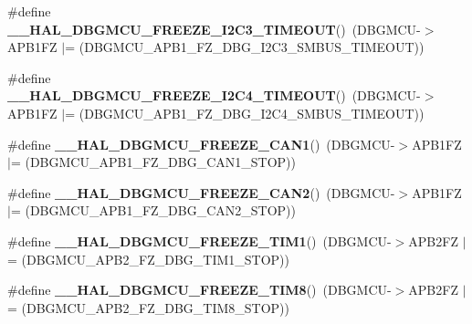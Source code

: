 \begin{DoxyCompactItemize}
\#define {\bfseries \+\_\+\+\_\+\+H\+A\+L\+\_\+\+D\+B\+G\+M\+C\+U\+\_\+\+F\+R\+E\+E\+Z\+E\+\_\+\+I2\+C3\+\_\+\+T\+I\+M\+E\+O\+UT}()~(D\+B\+G\+M\+CU-\/$>$A\+P\+B1\+FZ $\vert$= (D\+B\+G\+M\+C\+U\+\_\+\+A\+P\+B1\+\_\+\+F\+Z\+\_\+\+D\+B\+G\+\_\+\+I2\+C3\+\_\+\+S\+M\+B\+U\+S\+\_\+\+T\+I\+M\+E\+O\+UT))
\item 
\mbox{\label{group___h_a_l___exported___macros_ga94dfdca0c7c69da6f2cf1c516bc1b02c}} 
\#define {\bfseries \+\_\+\+\_\+\+H\+A\+L\+\_\+\+D\+B\+G\+M\+C\+U\+\_\+\+F\+R\+E\+E\+Z\+E\+\_\+\+I2\+C4\+\_\+\+T\+I\+M\+E\+O\+UT}()~(D\+B\+G\+M\+CU-\/$>$A\+P\+B1\+FZ $\vert$= (D\+B\+G\+M\+C\+U\+\_\+\+A\+P\+B1\+\_\+\+F\+Z\+\_\+\+D\+B\+G\+\_\+\+I2\+C4\+\_\+\+S\+M\+B\+U\+S\+\_\+\+T\+I\+M\+E\+O\+UT))
\item 
\mbox{\label{group___h_a_l___exported___macros_ga1d225003f36f6a22ffea1a41a4a78cec}} 
\#define {\bfseries \+\_\+\+\_\+\+H\+A\+L\+\_\+\+D\+B\+G\+M\+C\+U\+\_\+\+F\+R\+E\+E\+Z\+E\+\_\+\+C\+A\+N1}()~(D\+B\+G\+M\+CU-\/$>$A\+P\+B1\+FZ $\vert$= (D\+B\+G\+M\+C\+U\+\_\+\+A\+P\+B1\+\_\+\+F\+Z\+\_\+\+D\+B\+G\+\_\+\+C\+A\+N1\+\_\+\+S\+T\+OP))
\item 
\mbox{\label{group___h_a_l___exported___macros_gadb4f2b03a03936de95c1a9f939d452c0}} 
\#define {\bfseries \+\_\+\+\_\+\+H\+A\+L\+\_\+\+D\+B\+G\+M\+C\+U\+\_\+\+F\+R\+E\+E\+Z\+E\+\_\+\+C\+A\+N2}()~(D\+B\+G\+M\+CU-\/$>$A\+P\+B1\+FZ $\vert$= (D\+B\+G\+M\+C\+U\+\_\+\+A\+P\+B1\+\_\+\+F\+Z\+\_\+\+D\+B\+G\+\_\+\+C\+A\+N2\+\_\+\+S\+T\+OP))
\item 
\mbox{\label{group___h_a_l___exported___macros_ga93d7e54d78e5dea068f5f6a94d5f94c7}} 
\#define {\bfseries \+\_\+\+\_\+\+H\+A\+L\+\_\+\+D\+B\+G\+M\+C\+U\+\_\+\+F\+R\+E\+E\+Z\+E\+\_\+\+T\+I\+M1}()~(D\+B\+G\+M\+CU-\/$>$A\+P\+B2\+FZ $\vert$= (D\+B\+G\+M\+C\+U\+\_\+\+A\+P\+B2\+\_\+\+F\+Z\+\_\+\+D\+B\+G\+\_\+\+T\+I\+M1\+\_\+\+S\+T\+OP))
\item 
\mbox{\label{group___h_a_l___exported___macros_gaeee90b698bfc2421155265b4c5b43f09}} 
\#define {\bfseries \+\_\+\+\_\+\+H\+A\+L\+\_\+\+D\+B\+G\+M\+C\+U\+\_\+\+F\+R\+E\+E\+Z\+E\+\_\+\+T\+I\+M8}()~(D\+B\+G\+M\+CU-\/$>$A\+P\+B2\+FZ $\vert$= (D\+B\+G\+M\+C\+U\+\_\+\+A\+P\+B2\+\_\+\+F\+Z\+\_\+\+D\+B\+G\+\_\+\+T\+I\+M8\+\_\+\+S\+T\+OP))

\end{DoxyCompactItemize}
